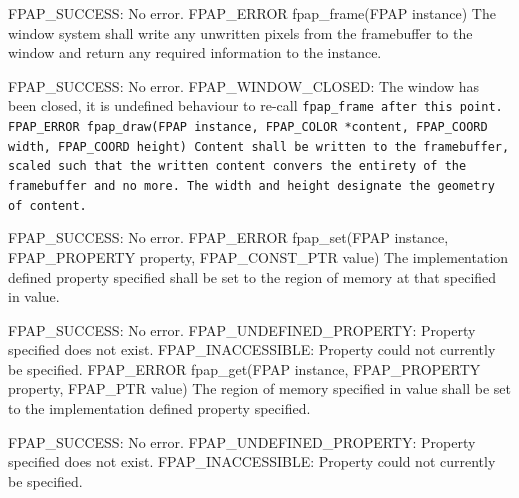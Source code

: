 \error FPAP\_SUCCESS: No error.
\code
FPAP\_ERROR fpap\_frame(FPAP instance)\cr
\ecode
\noindent The window system shall write any unwritten pixels from the
framebuffer to the window and return any required information to the instance.

\error FPAP\_SUCCESS: No error.
\error FPAP\_WINDOW\_CLOSED: The window has been closed, it is undefined
behaviour to re-call \tt fpap\_frame \rm after this point.
\code
FPAP\_ERROR fpap\_draw(FPAP instance, FPAP\_COLOR *content,\cr
\qquad FPAP\_COORD width, FPAP\_COORD height)\cr
\ecode
\noindent Content shall be written to the framebuffer, scaled such that the
written content convers the entirety of the framebuffer and no more. The
width and height designate the geometry of content.

\error FPAP\_SUCCESS: No error.
\code
FPAP\_ERROR fpap\_set(FPAP instance, FPAP\_PROPERTY property,\cr
\qquad FPAP\_CONST\_PTR value)\cr
\ecode
\noindent The implementation defined property specified shall be set to the
region of memory at that specified in value.

\error FPAP\_SUCCESS: No error.
\error FPAP\_UNDEFINED\_PROPERTY: Property specified does not exist.
\error FPAP\_INACCESSIBLE: Property could not currently be specified.
\code
FPAP\_ERROR fpap\_get(FPAP instance, FPAP\_PROPERTY property,\cr
\qquad FPAP\_PTR value)\cr
\ecode
\noindent The region of memory specified in value shall be set to the
implementation defined property specified.

\error FPAP\_SUCCESS: No error.
\error FPAP\_UNDEFINED\_PROPERTY: Property specified does not exist.
\error FPAP\_INACCESSIBLE: Property could not currently be specified.
\edefinitions

\vfill\break
